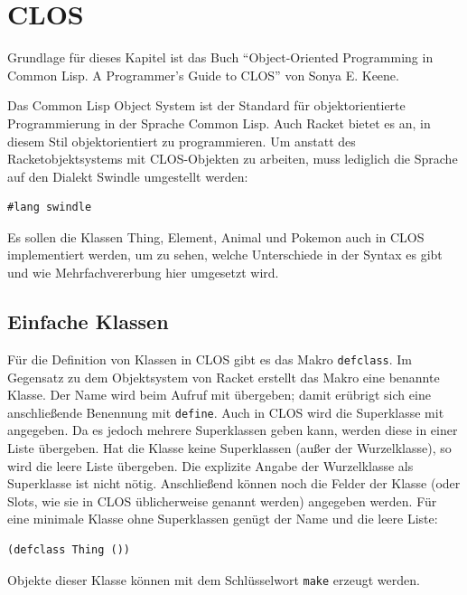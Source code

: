 \section{CLOS}
Grundlage für dieses Kapitel ist das Buch ``Object-Oriented Programming in Common Lisp. A Programmer's Guide to CLOS'' \cite{keene} von Sonya E. Keene. 

Das Common Lisp Object System ist der Standard für objektorientierte Programmierung in der Sprache Common Lisp. Auch Racket bietet es an, in diesem Stil objektorientiert zu programmieren. Um anstatt des Racketobjektsystems mit CLOS-Objekten zu arbeiten, muss lediglich die Sprache auf den Dialekt Swindle umgestellt werden:


\begin{lstlisting}
#lang swindle
\end{lstlisting}

Es sollen die Klassen Thing, Element, Animal und Pokemon auch in CLOS implementiert werden, um zu sehen, welche Unterschiede in der Syntax es gibt und wie Mehrfachvererbung hier umgesetzt wird. 

\subsection{Einfache Klassen}
Für die Definition von Klassen in CLOS gibt es das Makro \texttt{defclass}. Im Gegensatz zu dem Objektsystem von Racket erstellt das Makro eine benannte Klasse. Der Name wird beim Aufruf mit übergeben; damit erübrigt sich eine anschließende Benennung mit \texttt{define}. Auch in CLOS wird die Superklasse mit angegeben. Da es jedoch mehrere Superklassen geben kann, werden diese in einer Liste übergeben. Hat die Klasse keine Superklassen (außer der Wurzelklasse), so wird die leere Liste übergeben. Die explizite Angabe der Wurzelklasse als Superklasse ist nicht nötig. Anschließend können noch die Felder der Klasse (oder Slots, wie sie in CLOS üblicherweise genannt werden) angegeben werden. Für eine minimale Klasse ohne Superklassen genügt der Name und die leere Liste: 

\begin{lstlisting}
(defclass Thing ())
\end{lstlisting}


Objekte dieser Klasse können mit dem Schlüsselwort \texttt{make} erzeugt werden.


